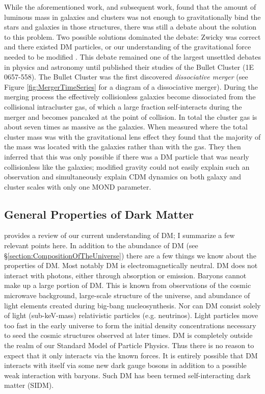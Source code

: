While the aforementioned work, and subsequent work, found that the amount of luminous mass in galaxies and clusters was not enough to gravitationally bind the stars and galaxies in those structures, there was still a debate about the solution to this problem. 
Two possible solutions dominated the debate: Zwicky was correct and there existed DM particles, or our understanding of the gravitational force needed to be modified \citep[see][for a review]{Sanders:2002cc}.
This debate remained one of the largest unsettled debates in physics and astronomy until \citet{Clowe:2004eq} published their studies of the Bullet Cluster (1E 0657-558).
The Bullet Cluster was the first discovered \textit{dissociative merger} (see Figure \ref{fig:MergerTimeSeries} for a diagram of a dissociative merger).
During the merging process the effectively collisionless galaxies  become dissociated from the collisional intracluster gas, of which a large fraction self-interacts during the merger and becomes pancaked at the point of collision.
In total the cluster gas is about seven times as massive as the galaxies.
When \citet{Clowe:2004eq} measured where the total cluster mass was with the gravitational lens effect they found that the majority of the mass was located with the galaxies rather than with the gas.
They then inferred that this was only possible if there was a DM particle that was nearly collisionless like the galaxies; modified gravity could not easily explain such an observation and simultaneously explain CDM dynamics on both galaxy and cluster scales with only one MOND parameter.

\subsection{General Properties of Dark Matter}\label{section:CDMproperties}

\citet{Peter:2012tg} provides a review of our current understanding of DM;  I summarize a few relevant points here.
In addition to the abundance of DM (see \S \ref{section:CompositionOfTheUniverse}) there are a few things we know about the properties of DM.
Most notably DM is electromagnetically neutral.
DM does not interact with photons, either through absorption or emission.
Baryons cannot make up a large portion of DM.
This is known from observations of the cosmic microwave background, large-scale structure of the universe, and abundance of light elements created during big-bang nucleosynthesis.
Nor can DM consist solely of light (sub-keV-mass) relativistic particles (e.g. neutrinos). 
Light particles move too fast in the early universe to form the initial density concentrations necessary to seed the cosmic structures observed at later times.
DM is completely outside the realm of our Standard Model of Particle Physics.
Thus there is no reason to expect that it only interacts via the known forces.
It is entirely possible that DM interacts with itself via some new dark gauge bosons in addition to a possible weak interaction with baryons.
Such DM has been termed self-interacting dark matter (SIDM).

